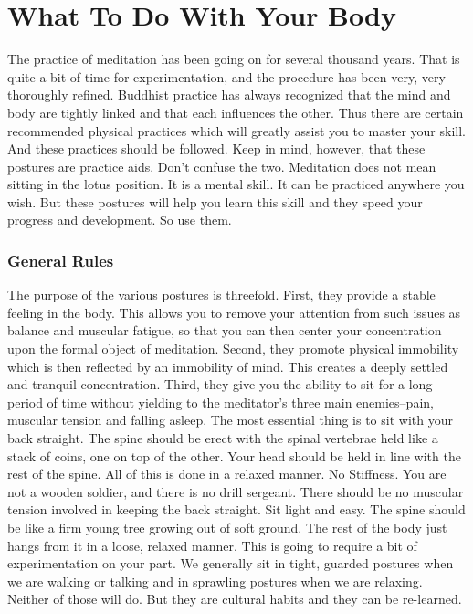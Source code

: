 \chapter{What To Do With Your Body} 
The practice of meditation has been going
on for several thousand years. That is quite a bit of time for experimentation,
and the procedure has been very, very thoroughly refined. Buddhist practice has
always recognized that the mind and body are tightly linked and that each
influences the other. Thus there are certain recommended physical practices
which will greatly assist you to master your skill. And these practices should
be followed. Keep in mind, however, that these postures are practice aids. Don't
confuse the two. Meditation does not mean sitting in the lotus position. It is a
mental skill. It can be practiced anywhere you wish. But these postures will
help you learn this skill and they speed your progress and development. So use
them.

\subsection*{General Rules} 
The purpose of the various postures is threefold. First, they
provide a stable feeling in the body. This allows you to remove your attention
from such issues as balance and muscular fatigue, so that you can then center
your concentration upon the formal object of meditation. Second, they promote
physical immobility which is then reflected by an immobility of mind. This
creates a deeply settled and tranquil concentration. Third, they give you the
ability to sit for a long period of time without yielding to the meditator's
three main enemies--pain, muscular tension and falling asleep. The most
essential thing is to sit with your back straight. The spine should be erect
with the spinal vertebrae held like a stack of coins, one on top of the other.
Your head should be held in line with the rest of the spine. All of this is done
in a relaxed manner. No Stiffness. You are not a wooden soldier, and there is no
drill sergeant. There should be no muscular tension involved in keeping the back
straight. Sit light and easy. The spine should be like a firm young tree growing
out of soft ground. The rest of the body just hangs from it in a loose, relaxed
manner. This is going to require a bit of experimentation on your part. We
generally sit in tight, guarded postures when we are walking or talking and in
sprawling postures when we are relaxing. Neither of those will do. But they are
cultural habits and they can be re-learned.

